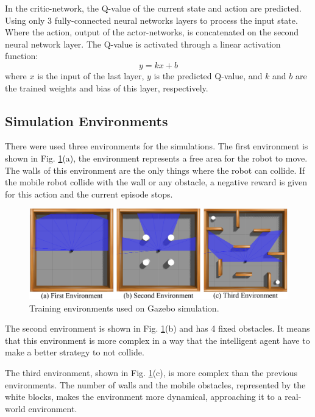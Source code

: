 In the critic-network, the Q-value of the current state and action are predicted.
Using only 3 fully-connected neural networks layers to process the input state.
Where the action, output of the actor-networks, is concatenated on the second neural network layer.
The Q-value is activated through a linear activation function:
\begin{equation}
y = kx +b
\end{equation}
where $x$ is the input of the last layer, $y$ is the predicted Q-value, and $k$ and $b$ are the trained weights and bias of this layer, respectively.

\subsection*{Simulation Environments}

There were used three environments for the simulations. The first environment is  shown in Fig. \ref{fig:environments}(a), the environment represents a free area for the robot to move.
The walls of this environment are the only things where the robot can collide.
If the mobile robot collide with the wall or any obstacle, a negative reward is given for this action and the current episode stops.

\begin{figure}
\centerline{\includegraphics[width=\columnwidth]{images/environments1.png}}
\caption{Training environments used on Gazebo simulation.}
\label{fig:environments}
\end{figure}

The second environment is shown in Fig. \ref{fig:environments}(b) and has 4 fixed obstacles.
It means that this environment is more complex in a way that the intelligent agent have to make a better strategy to not collide.

The third environment, shown in Fig. \ref{fig:environments}(c), is more complex than the previous environments.  
The number of walls and the mobile obstacles, represented by the white blocks, makes the environment more dynamical, approaching it to a real-world environment.

